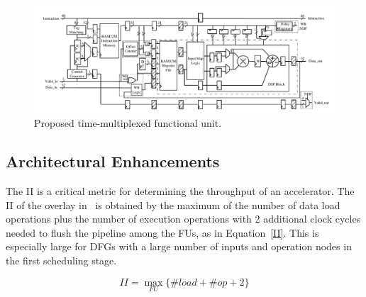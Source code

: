 \begin{figure}[!tb]
	\centering
	\includegraphics[trim={1cm 0.5cm 1cm 1cm},width=14cm]{figures/FU_WB_new_2.pdf}
	\caption{Proposed time-multiplexed functional unit.}
	\label{fu}
\end{figure}

\subsection{Architectural Enhancements}
The II is a critical metric for determining the throughput of an accelerator.
The II of the overlay in~\cite{li2016area} is obtained by the maximum of the number of data load operations plus the number of execution operations with 2 additional clock cycles needed to flush the pipeline among the FUs, as in Equation~\ref{II}.
This is especially large for DFGs with a large number of inputs and operation nodes in the first scheduling stage.

\begin{equation}
	II =  \max_{FU} \{\#load + \#op + 2\}
	\label{II}
\end{equation}


